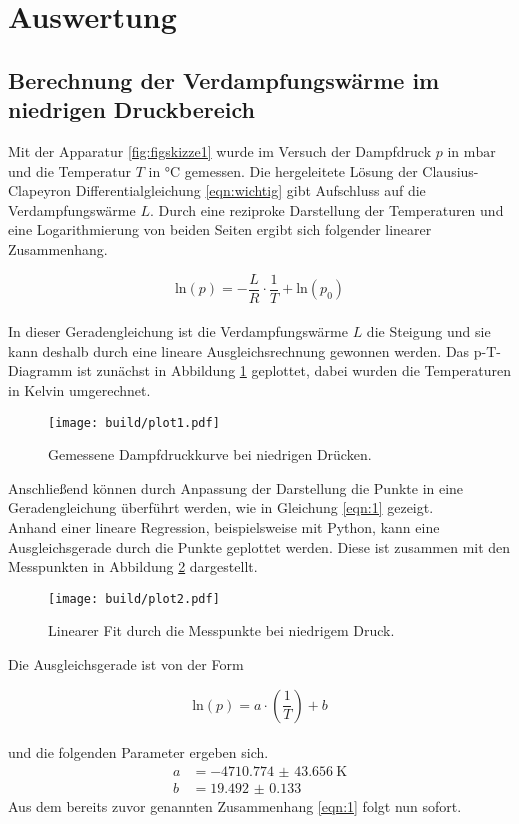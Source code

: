\section{Auswertung}

\subsection{Berechnung der Verdampfungswärme im niedrigen Druckbereich}

Mit der Apparatur \ref{fig:figskizze1} wurde im Versuch der Dampfdruck $p$ in $\si{\milli\bar}$ und die Temperatur $T$ in $\si{\celsius}$ gemessen. Die hergeleitete Lösung 
der Clausius-Clapeyron Differentialgleichung \eqref{eqn:wichtig} gibt Aufschluss auf die Verdampfungswärme $L$. Durch eine reziproke Darstellung der Temperaturen und eine Logarithmierung von beiden Seiten
ergibt sich folgender linearer Zusammenhang.

\begin{equation}
\label{eqn:1}
\text{ln}(p) = - \frac{L}{R} \cdot \frac{1}{T} + \text{ln}(p_{0})
\end{equation}
\\
In dieser Geradengleichung ist die Verdampfungswärme $L$ die Steigung und sie kann deshalb durch eine lineare Ausgleichsrechnung gewonnen werden.
Das p-T-Diagramm ist zunächst in Abbildung \ref{fig:plot1} geplottet, dabei wurden die Temperaturen in Kelvin umgerechnet.
\begin{figure}[h]
    \centering
    \texttt{[image: build/plot1.pdf]}
    \caption{Gemessene Dampfdruckkurve bei niedrigen Drücken.}
    \label{fig:plot1}
  \end{figure}
Anschließend können durch Anpassung der Darstellung die Punkte in eine Geradengleichung überführt werden, wie in Gleichung \eqref{eqn:1} gezeigt. 
\\
Anhand einer lineare Regression, beispielsweise mit Python, kann eine Ausgleichsgerade durch die Punkte geplottet werden. Diese ist zusammen mit den Messpunkten in Abbildung \ref{fig:plot2} dargestellt.
\begin{figure}[h]
    \centering
    \texttt{[image: build/plot2.pdf]}
    \caption{Linearer Fit durch die Messpunkte bei niedrigem Druck.}
    \label{fig:plot2}
\end{figure}
Die Ausgleichsgerade ist von der Form

\begin{equation}
\text{ln}(p) = a \cdot \left( \frac{1}{T}\right) +b
\end{equation}
\\
und die folgenden Parameter ergeben sich.
\begin{align}
a &= \SI{-4710.774(43656)}{\kelvin} \\
b &= \SI{19.492(0133)}{}
\end{align}
Aus dem bereits zuvor genannten Zusammenhang \eqref{eqn:1} folgt nun sofort.


